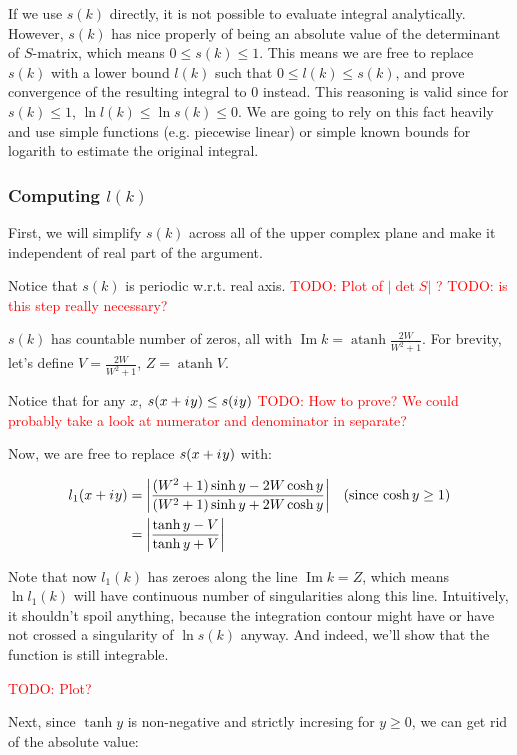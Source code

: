 \documentclass[12pt, a4paper]{article}
\newcommand{\abs}[1]{\left| #1 \right|}
\newcommand{\iu}{{i\mkern1mu}}
\renewcommand{\Im}{\operatorname{Im}}
\newcommand{\todo}[1]{{\large \textcolor{red}{TODO: #1}}}
\DeclareMathOperator\atanh{atanh}
\begin{document}
If we use $s(k)$ directly, it is not possible to evaluate integral analytically. However, $s(k)$ has nice properly of being an absolute value of the determinant of $S$-matrix, which means $0 \le s(k) \le 1$. This means we are free to replace $s(k)$ with a lower bound $l(k)$ such that $0 \le l(k) \le s(k)$, and prove convergence of the resulting integral to $0$ instead. This reasoning is valid since for $s(k) \le 1$, $\ln l(k) \le \ln s(k) \le 0$. We are going to rely on this fact heavily and use simple functions (e.g. piecewise linear) or simple known bounds for logarith to estimate the original integral.

\subsubsection{Computing $l(k)$}
First, we will simplify $s(k)$ across all of the upper complex plane and make it independent of real part of the argument.

Notice that $s(k)$ is periodic w.r.t. real axis.
\todo{Plot of $\abs{\det S}$ ?}
\todo{is this step really necessary?}

$s(k)$ has countable number of zeros, all with $\Im k = \atanh \frac{2 W}{W^2 + 1}$. For brevity, let's define $V = \frac{2 W}{W^2 + 1}$, $Z = \atanh V$.

Notice that for any $x$, $s(x + \iu y) \le s(\iu y)$
\todo{How to prove? We could probably take a look at numerator and denominator in separate?}

Now, we are free to replace $s(x + \iu y)$ with:

\begin{align*}
l_1(x + \iu y)
 &= \abs{\frac{(W^2 + 1) \sinh y - 2 W \cosh y}{(W^2 + 1) \sinh y + 2 W \cosh y}} && \text{(since $\cosh y \ge 1$)}\\
 &= \abs{\frac{\tanh y - V}{\tanh y + V}}
\end{align*}

Note that now $l_1(k)$ has zeroes along the line $\Im k = Z$, which means $\ln l_1(k)$ will have continuous number of singularities along this line. Intuitively, it shouldn't spoil anything, because the integration contour might have or have not crossed a singularity of $\ln s(k)$ anyway. And indeed, we'll show that the function is still integrable.

\todo{Plot?}

Next, since $\tanh y$ is non-negative and strictly incresing for $y \ge 0$, we can get rid of the absolute value:
\end{document}
